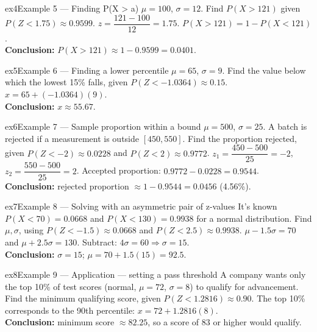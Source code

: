 \documentclass[11pt]{article}
\begin{document}
\begin{example}{ex4}{Example 5 --- Finding P(X > a)}
$\mu=100$, $\sigma=12$. Find $P(X>121)$ given $P(Z<1.75)\approx0.9599$.\soln
$z=\dfrac{121-100}{12}=1.75$. $P(X>121)=1-P(X<121)$.\\[3pt]\textbf{Conclusion:} $P(X>121)\approx1-0.9599=0.0401$.
\end{example}

\begin{example}{ex5}{Example 6 --- Finding a lower percentile}
$\mu=65$, $\sigma=9$. Find the value below which the lowest 15\% falls, given $P(Z<-1.0364)\approx0.15$.\soln
$x=65+(-1.0364)(9)$.\\[3pt]\textbf{Conclusion:} $x\approx55.67$.
\end{example}

\begin{example}{ex6}{Example 7 --- Sample proportion within a bound}
$\mu=500$, $\sigma=25$. A batch is rejected if a measurement is outside $[450,550]$. Find the proportion rejected, given $P(Z<-2)\approx0.0228$ and $P(Z<2)\approx0.9772$.\soln
$z_1=\dfrac{450-500}{25}=-2$, $z_2=\dfrac{550-500}{25}=2$. Accepted proportion: $0.9772-0.0228=0.9544$.\\[3pt]\textbf{Conclusion:} rejected proportion $\approx1-0.9544=0.0456$ (4.56\%).
\end{example}

\begin{example}{ex7}{Example 8 --- Solving with an asymmetric pair of z-values}
It's known $P(X<70)=0.0668$ and $P(X<130)=0.9938$ for a normal distribution. Find $\mu,\sigma$, using $P(Z<-1.5)\approx0.0668$ and $P(Z<2.5)\approx0.9938$.\soln
$\mu-1.5\sigma=70$ and $\mu+2.5\sigma=130$. Subtract: $4\sigma=60\Rightarrow\sigma=15$.\\[3pt]\textbf{Conclusion:} $\sigma=15$; $\mu=70+1.5(15)=92.5$.
\end{example}

\begin{example}{ex8}{Example 9 --- Application --- setting a pass threshold}
A company wants only the top 10\% of test scores (normal, $\mu=72$, $\sigma=8$) to qualify for advancement. Find the minimum qualifying score, given $P(Z<1.2816)\approx0.90$.\soln
The top 10\% corresponds to the 90th percentile: $x=72+1.2816(8)$.\\[3pt]\textbf{Conclusion:} minimum score $\approx82.25$, so a score of $83$ or higher would qualify.
\end{example}
\end{document}
